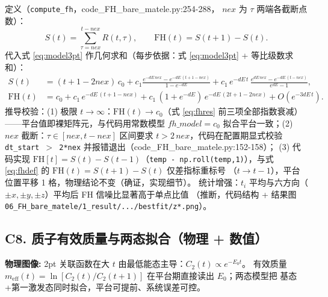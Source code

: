 \documentclass[UTF8]{ctexart}
\begin{document}
定义（\texttt{\nolinkurl{compute_fh}}，code\_FH\_bare\_matele.py:254-288，
$nex$ 为 $\tau$ 两端各截断点数）：
\begin{equation}\label{eq:fhdef}
S(t)=\sum_{\tau=nex}^{t-nex} R(t,\tau),\qquad
\mathrm{FH}(t)=S(t+1)-S(t).
\end{equation}
代入式 \eqref{eq:model3pt} 作几何求和（每步依据：式 \eqref{eq:model3pt} + 等比级数求和）：
\begin{align}
S(t)&=(t+1-2nex)\,c_0
+c_1\frac{e^{-dE\,nex}-e^{-dE\,(t+1-nex)}}{1-e^{-dE}}
+c_1\,e^{-dE\,t}\,\frac{e^{dE\,nex}-e^{-dE\,(t-nex)}}{e^{dE}-1},\label{eq:fhS}\\
\mathrm{FH}(t)&=c_0+c_1\,e^{-dE\,(t+1-nex)}
+c_1\,(1+e^{-dE})\,e^{-dE\,(2t+1-2nex)}+O(e^{-3dE\,t}).\label{eq:fhres}
\end{align}
\noindent 推导校验：\textcolor{accent}{(1)} 极限 $t\to\infty$：$\mathrm{FH}(t)\to c_0$（式
\eqref{eq:fhres} 前三项全部指数衰减）——平台值即裸矩阵元，与代码用常数模型
$fh\_model=c_0$ 拟合平台一致；\textcolor{accent}{(2)} $nex$ 截断：$\tau\in[nex,t-nex]$
区间要求 $t>2\,nex$，代码在配置期显式校验
\texttt{dt\_start $>$ 2*nex} 并报错退出（code\_FH\_bare\_matele.py:152-158）；
\textcolor{accent}{(3)} 代码实现 $\mathrm{FH}[t]=S(t)-S(t-1)$（\texttt{temp -
np.roll(temp,1)}），与式 \eqref{eq:fhdef} 的 $\mathrm{FH}(t)=S(t+1)-S(t)$ 仅差指标重标号
（$t\to t-1$），平台位置平移 1 格，物理结论不变（\textcolor{accent}{确证}，实现细节）。
统计增强：$t_i$ 平均与六方向（$\pm x,\pm y,\pm z$）平均后 FH 信噪比显著高于单点比值
（\textcolor{phys}{推断}，代码结构 + 结果图 \texttt{\nolinkurl{06_FH_bare_matele/1_result/.../bestfit/z*.png}}）。



\subsection{C8. 质子有效质量与两态拟合（物理 + 数值）}

\begin{physbox}
\textbf{物理图像:} 2pt 关联函数在大 $t$ 由最低能态主导：$C_2(t)\propto e^{-E_0 t}$。
有效质量 $m_{\text{eff}}(t)=\ln[C_2(t)/C_2(t+1)]$ 在平台期直接读出 $E_0$；两态模型把
基态+第一激发态同时拟合，平台可提前、系统误差可控。
\end{physbox}
\end{document}
